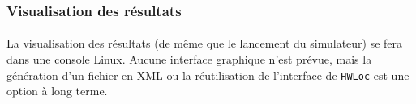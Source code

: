 \subsubsection{Visualisation des résultats}
\paragraph{}
La visualisation des résultats (de même que le lancement du simulateur) se fera dans une console Linux. Aucune interface graphique n'est prévue, mais la génération d'un fichier en XML ou la réutilisation de l'interface de \texttt{HWLoc} est une option à long terme.
